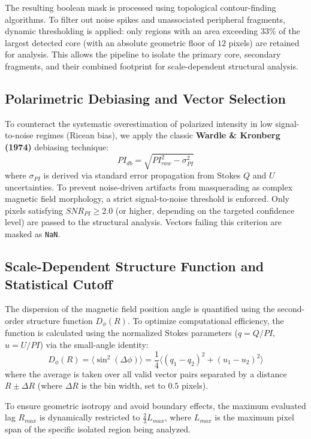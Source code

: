 \documentclass[10pt, a4paper]{article}
\begin{document}
The resulting boolean mask is processed using topological contour-finding algorithms. To filter out noise spikes and unassociated peripheral fragments, dynamic thresholding is applied: only regions with an area exceeding $33\%$ of the largest detected core (with an absolute geometric floor of $12$ pixels) are retained for analysis. This allows the pipeline to isolate the primary core, secondary fragments, and their combined footprint for scale-dependent structural analysis.

\subsection*{Polarimetric Debiasing and Vector Selection}
To counteract the systematic overestimation of polarized intensity in low signal-to-noise regimes (Ricean bias), we apply the classic \textbf{Wardle \& Kronberg (1974)} debiasing technique:
\begin{equation}
    PI_{db} = \sqrt{PI_{raw}^2 - \sigma_{PI}^2}
\end{equation}
where $\sigma_{PI}$ is derived via standard error propagation from Stokes $Q$ and $U$ uncertainties. To prevent noise-driven artifacts from masquerading as complex magnetic field morphology, a strict signal-to-noise threshold is enforced. Only pixels satisfying $SNR_{PI} \ge 2.0$ (or higher, depending on the targeted confidence level) are passed to the structural analysis. Vectors failing this criterion are masked as \texttt{NaN}.

\subsection*{Scale-Dependent Structure Function and Statistical Cutoff}
The dispersion of the magnetic field position angle is quantified using the second-order structure function $D_\phi(R)$. To optimize computational efficiency, the function is calculated using the normalized Stokes parameters ($q = Q/PI$, $u = U/PI$) via the small-angle identity:
\begin{equation}
    D_\phi(R) = \langle \sin^2(\Delta \phi) \rangle = \frac{1}{4} \langle (q_1 - q_2)^2 + (u_1 - u_2)^2 \rangle
\end{equation}
where the average is taken over all valid vector pairs separated by a distance $R \pm \Delta R$ (where $\Delta R$ is the bin width, set to $0.5$ pixels).

To ensure geometric isotropy and avoid boundary effects, the maximum evaluated lag $R_{max}$ is dynamically restricted to $\frac{2}{3} L_{max}$, where $L_{max}$ is the maximum pixel span of the specific isolated region being analyzed. 
\end{document}
